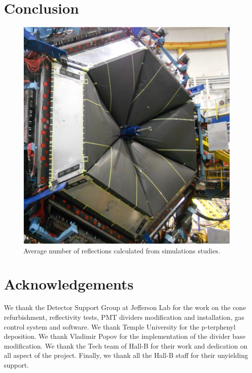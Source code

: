 \section{Conclusion}

\begin{figure}
	\centering
	\includegraphics[width=1.0\columnwidth,keepaspectratio]{img/ltccInstalled.png}
	\caption{Average number of reflections calculated from simulations studies.}
	\label{fig:ltccInstalled}
\end{figure}


\section{Acknowledgements}

We thank the Detector Support Group at Jefferson Lab for the work on the cone refurbishment, reflectivity tests,
PMT dividers modification and installation, gas control system and software.
We thank Temple University for the p-terphenyl deposition. We thank Vladimir Popov for the implementation
of the divider base modification. We thank the Tech team of Hall-B for their work
and dedication on all aspect of the project. Finally, we thank all the Hall-B staff for their unyielding support.

